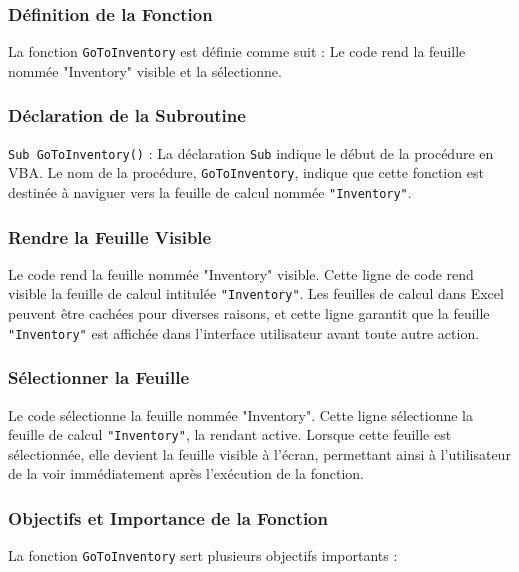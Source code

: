 \documentclass[a4paper, oneside, 12pt, final]{extreport}
\begin{document}
\subsubsection{Définition de la Fonction}

La fonction \texttt{GoToInventory} est définie comme suit :
Le code rend la feuille nommée "Inventory" visible et la sélectionne.

\subsubsection{Déclaration de la Subroutine}

\texttt{Sub GoToInventory()} : La déclaration \texttt{Sub} indique le début de la procédure en VBA. Le nom de la procédure, \texttt{GoToInventory}, indique que cette fonction est destinée à naviguer vers la feuille de calcul nommée \texttt{"Inventory"}.

\subsubsection{Rendre la Feuille Visible}
Le code rend la feuille nommée "Inventory" visible.
Cette ligne de code rend visible la feuille de calcul intitulée \texttt{"Inventory"}. Les feuilles de calcul dans Excel peuvent être cachées pour diverses raisons, et cette ligne garantit que la feuille \texttt{"Inventory"} est affichée dans l'interface utilisateur avant toute autre action.

\subsubsection{Sélectionner la Feuille}
Le code sélectionne la feuille nommée "Inventory".
Cette ligne sélectionne la feuille de calcul \texttt{"Inventory"}, la rendant active. Lorsque cette feuille est sélectionnée, elle devient la feuille visible à l'écran, permettant ainsi à l'utilisateur de la voir immédiatement après l'exécution de la fonction.

\subsubsection{Objectifs et Importance de la Fonction}

La fonction \texttt{GoToInventory} sert plusieurs objectifs importants :
\end{document}
